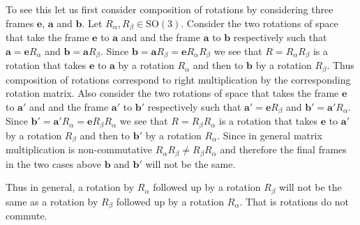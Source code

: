 \documentclass[graybox,envcountchap,sectrefs]{svmonoMuga}
\begin{document}
To see this let us first consider composition of rotations by considering three frames $\mathbf{e}$, $\mathbf{a}$ and $\mathbf{b}$. Let $R_{\alpha},R_{\beta}\in \mathrm{SO}(3)$. 
Consider the two rotations of space that take the frame $\mathbf{e}$ to $\mathbf{a}$ and and the frame $\mathbf{a}$ to $\mathbf{b}$ respectively such that $\mathbf{a}=\mathbf{e}R_{\alpha}$ and $\mathbf{b}=\mathbf{a}R_{\beta}$. Since $\mathbf{b}=\mathbf{a}R_{\beta}=\mathbf{e}R_{\alpha}R_{\beta}$ we see that $R=R_{\alpha}R_{\beta}$ is a rotation that takes $\mathbf{e}$ to $\mathbf{a}$ by a rotation $R_{\alpha}$ and then to $\mathbf{b}$ by a rotation $R_{\beta}$. Thus composition of rotations correspond to right multiplication by the corresponding rotation matrix. 
Also consider the two rotations of space that takes the frame $\mathbf{e}$ to $\mathbf{a}'$ and and the frame $\mathbf{a}'$ to $\mathbf{b}'$ respectively such that $\mathbf{a}'=\mathbf{e}R_{\beta}$ and $\mathbf{b}'=\mathbf{a}'R_{\alpha}$. Since $\mathbf{b}'=\mathbf{a}'R_{\alpha}=\mathbf{e}R_{\beta}R_{\alpha}$ we see that $R=R_{\beta}R_{\alpha}$ is a rotation that takes $\mathbf{e}$ to $\mathbf{a}'$ by a rotation $R_{\beta}$ and then to $\mathbf{b}'$ by a rotation $R_{\alpha}$. Since in general matrix multiplication is non-commutative $R_{\alpha}R_{\beta}\neq R_{\beta}R_{\alpha}$ and therefore the final frames in the two cases above $\mathbf{b}$ and $\mathbf{b}'$ will not be the same. 
\begin{svgraybox}
Thus in general, a rotation by $R_{\alpha}$ followed up by a rotation $R_{\beta}$ will not be the same as a rotation by $R_{\beta}$ followed up by a rotation $R_{\alpha}$. That is rotations do not commute.
\end{svgraybox}
\end{document}
